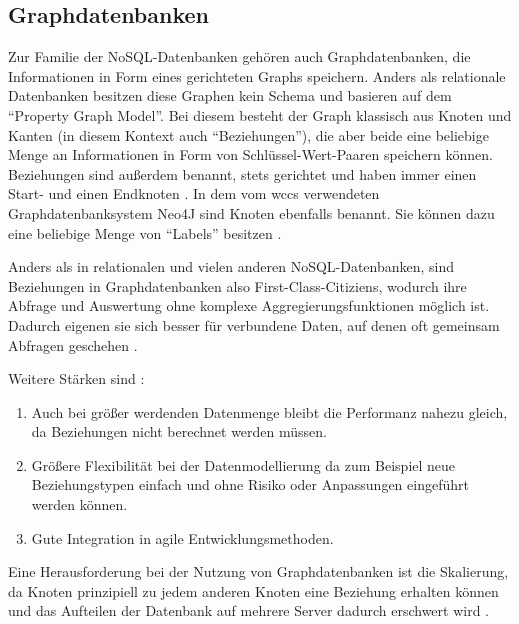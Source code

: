 \subsection{Graphdatenbanken}
    Zur Familie der NoSQL-Datenbanken gehören auch Graphdatenbanken,
    die Informationen in Form eines gerichteten Graphs speichern.
    Anders als relationale Datenbanken besitzen diese Graphen kein Schema
    und basieren auf dem "`Property Graph Model"'.
    Bei diesem besteht der Graph klassisch aus Knoten und Kanten
    (in diesem Kontext auch "`Beziehungen"'),
    die aber beide eine beliebige Menge an Informationen in Form
    von Schlüssel-Wert-Paaren speichern können.
    Beziehungen sind außerdem benannt, stets gerichtet und haben immer einen
    Start- und einen Endknoten
    \cite[Kapitel 1]{robinson:graphdatabases}.
    In dem vom \gls{wccs} verwendeten Graphdatenbanksystem Neo4J sind Knoten ebenfalls benannt.
    Sie können dazu eine beliebige Menge von "`Labels"' besitzen
    \cite[Kapitel 1.2.1.4]{neo4j:documentation}.

    Anders als in relationalen und vielen anderen NoSQL-Datenbanken,
    sind Beziehungen in Graphdatenbanken also First-Class-Citiziens,
    wodurch ihre Abfrage und Auswertung ohne komplexe Aggregierungsfunktionen möglich ist.
    Dadurch eigenen sie sich besser für verbundene Daten,
    auf denen oft gemeinsam Abfragen geschehen
    \cite[Kapitel 2]{robinson:graphdatabases}
    \cite[Kapitel 11.2]{sadalage:nosql}.

    Weitere Stärken sind
    \cite[Kapitel 1]{robinson:graphdatabases}
    \cite[Kapitel 11.1]{sadalage:nosql}:
    
    \begin{enumerate}
        \item   Auch bei größer werdenden Datenmenge bleibt die Performanz nahezu gleich,
                da Beziehungen nicht berechnet werden müssen.
        \item   Größere Flexibilität bei der Datenmodellierung da zum Beispiel
                neue Beziehungstypen einfach und ohne Risiko oder Anpassungen eingeführt werden können.
        \item   Gute Integration in agile Entwicklungsmethoden.
    \end{enumerate}
    
    Eine Herausforderung bei der Nutzung von Graphdatenbanken ist die Skalierung,
    da Knoten prinzipiell zu jedem anderen Knoten eine Beziehung erhalten können
    und das Aufteilen der Datenbank auf mehrere Server dadurch erschwert wird
    \cite[Kapitel 11.2.5]{sadalage:nosql}.

